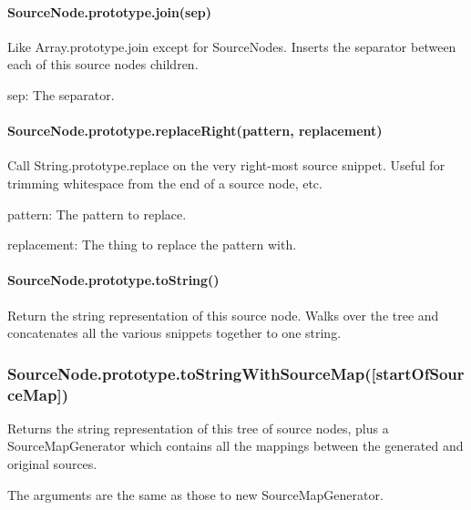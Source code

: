 \paragraph*{Source\+Node.\+prototype.\+join(sep)}

Like {\ttfamily Array.\+prototype.\+join} except for Source\+Nodes. Inserts the separator between each of this source node\textquotesingle{}s children.


\begin{DoxyItemize}
\item {\ttfamily sep}\+: The separator.
\end{DoxyItemize}

\paragraph*{Source\+Node.\+prototype.\+replace\+Right(pattern, replacement)}

Call {\ttfamily String.\+prototype.\+replace} on the very right-\/most source snippet. Useful for trimming whitespace from the end of a source node, etc.


\begin{DoxyItemize}
\item {\ttfamily pattern}\+: The pattern to replace.
\item {\ttfamily replacement}\+: The thing to replace the pattern with.
\end{DoxyItemize}

\paragraph*{Source\+Node.\+prototype.\+to\+String()}

Return the string representation of this source node. Walks over the tree and concatenates all the various snippets together to one string.

\subsubsection*{Source\+Node.\+prototype.\+to\+String\+With\+Source\+Map(\mbox{[}start\+Of\+Source\+Map\mbox{]})}

Returns the string representation of this tree of source nodes, plus a Source\+Map\+Generator which contains all the mappings between the generated and original sources.

The arguments are the same as those to {\ttfamily new Source\+Map\+Generator}.

